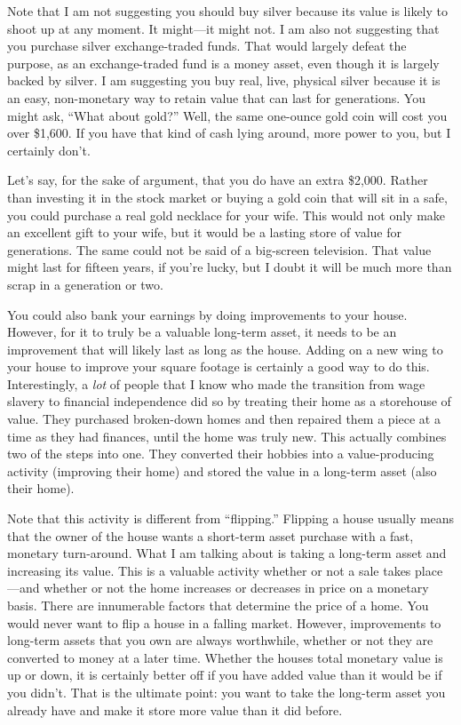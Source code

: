 Note that I am not suggesting you should buy silver because its value is
likely to shoot up at any moment. It might—it might not. I am also not
suggesting that you purchase silver exchange-traded funds. That would
largely defeat the purpose, as an exchange-traded fund is a money
asset, even though it is largely backed by silver. I am suggesting you
buy real, live, physical silver because it is an easy, non-monetary way
to retain value that can last for generations. You might ask, “What
about gold?”  Well, the same one-ounce gold coin will cost you over
\$1,600. If you have that kind of cash lying around, more power to you,
but I certainly don’t. 

Let’s say, for the sake of argument, that you do have an extra \$2,000.
Rather than investing it in the stock market or buying a gold coin that
will sit in a safe, you could purchase a real gold necklace for your
wife. This would not only make an excellent gift to your wife, but it
would be a lasting store of value for generations. The same could not
be said of a big-screen television. That value might last for fifteen
years, if you’re lucky, but I doubt it will be much more than scrap in
a generation or two. 

You could also bank your earnings by doing improvements to your house.
However, for it to truly be a valuable long-term asset, it needs to be
an improvement that will likely last as long as the house. Adding on a
new wing to your house to improve your square footage is certainly a
good way to do this. Interestingly, a \textit{lot} of people that I
know who made the transition from wage slavery to financial
independence did so by treating their home as a storehouse of value.
They purchased broken-down homes and then repaired them a piece at a
time as they had finances, until the home was truly new. This actually
combines two of the steps into one. They converted their hobbies into a
value-producing activity (improving their home) and stored the value in
a long-term asset (also their home). 

Note that this activity is different from “flipping.”  Flipping a house
usually means that the owner of the house wants a short-term asset
purchase with a fast, monetary turn-around. What I am talking about is
taking a long-term asset and increasing its value. This is a valuable
activity whether or not a sale takes place—and whether or not the home
increases or decreases in price on a monetary basis. There are
innumerable factors that determine the price of a home. You would never
want to flip a house in a falling market. However, improvements to
long-term assets that you own are always worthwhile, whether or not
they are converted to money at a later time. Whether the
house{\textquotesingle}s total monetary value is up or down, it is
certainly better off if you have added value than it would be if you
didn’t. That is the ultimate point: you want to take the long-term
asset you already have and make it store more value than it did
before.

